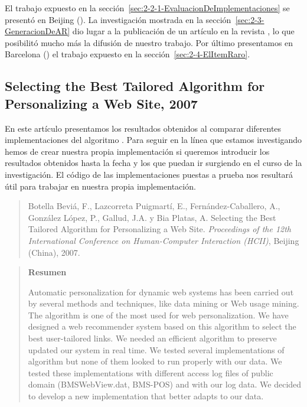 El trabajo expuesto en la sección~\ref{sec:2-2-1-EvaluacionDeImplementaciones} se presentó en Beijing (). La investigación mostrada en la sección~\ref{sec:2-3-GeneracionDeAR} dio lugar a la publicación de un artículo en la revista , lo que posibilitó mucho más la difusión de nuestro trabajo. Por último presentamos en Barcelona () el trabajo expuesto en la sección~\ref{sec:2-4-ElItemRaro}.





\subsection*{Selecting the Best Tailored Algorithm for Personalizing a Web Site, 2007}
\label{sec:nuestro-Selecting-2007}
En este artículo presentamos los resultados obtenidos al comparar diferentes implementaciones del algoritmo \apriori. Para seguir en la línea que estamos investigando hemos de crear nuestra propia implementación si queremos introducir los resultados obtenidos hasta la fecha y los que puedan ir surgiendo en el curso de la investigación. El código de las implementaciones puestas a prueba nos resultará útil para trabajar en nuestra propia implementación.

\begin{quote}
  Botella Beviá, F., Lazcorreta Puigmartí, E., Fernández-Caballero, A., González López, P., Gallud,
J.A. y Bia Platas, A. Selecting the Best Tailored Algorithm for Personalizing a Web Site. \emph{Proceedings of the 12th International Conference on Human-Computer Interaction ({HCII})}, Beijing (China), 2007. 
\end{quote}

\begin{quotation}
	\noindent\textbf{Resumen}

	\nopagebreak Automatic personalization for dynamic web systems has been carried out by several methods and techniques, like data mining or Web usage mining. The \apriori algorithm is one of the most used for web personalization. We have designed a web recommender system based on this algorithm to select the best user-tailored links. We needed an efficient algorithm to preserve updated our system in real time. We tested several implementations of \apriori algorithm but none of them looked to run properly with our data. We tested these implementations with different access log files of public domain (BMSWebView.dat, BMS-POS) and with our log data. We decided to develop a new implementation that better adapts to our data.
\end{quotation}









